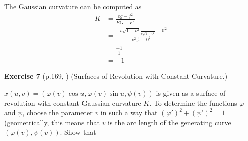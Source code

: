 \documentclass[a4paper]{report}
\begin{document}
The Gaussian curvature can be computed as
\begin{align}
K &= \frac{eg - f^2}{EG - F^2}\\
&= \frac{-v \sqrt{1 - v^2}\frac{1}{v \sqrt{1 - v^2}} - 0^2}{v^2\frac{1}{v^2} - 0^2}\\
&= \frac{-1}{1}\\
&= -1
\end{align}



\newpage
\textbf{Exercise 7} (p.169, \cite{2}) (Surfaces of Revolution with Constant Curvature.)

$x(u,v) = (\varphi(v) \cos u, \varphi(v) \sin u, \psi(v))$ is given as a surface of revolution with constant Gaussian curvature $K$. To determine the functions $\varphi$ and $\psi$, choose the parameter $v$ in such a way  that $(\varphi')^2 + (\psi')^2 = 1$ (geometrically, this means that $v$ is the arc length of the generating curve $(\varphi(v),\psi(v))$. Show that
\end{document}

